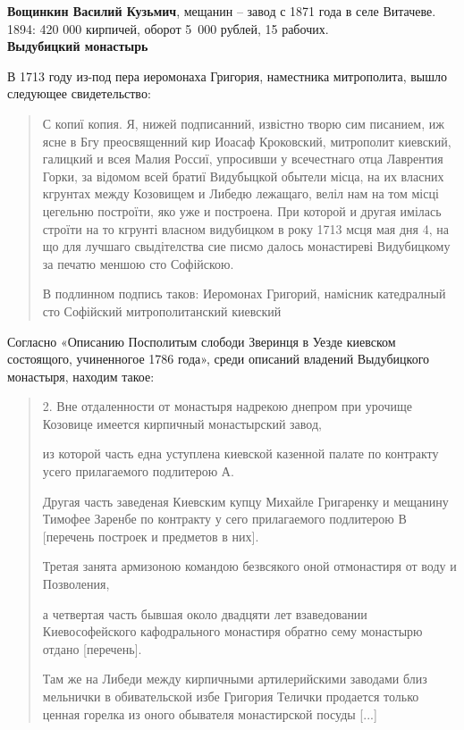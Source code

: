 \noindent\textbf{Вощинкин Василий Кузьмич}, мещанин – завод с 1871 года в селе Витачеве. 1894: 420 000 кирпичей, оборот \mbox{5 000} рублей, 15 рабочих.\\

\noindent\textbf{Выдубицкий монастырь}

В 1713 году из-под пера иеромонаха Григория, наместника митрополита, вышло следующее свидетельство:

\begin{quotation}
С копиї копия. Я, нижей подписанний, извістно творю сим писанием, иж ясне в Бгу преосвященний кир Иоасаф Кроковский, митрополит киевский, галицкий и всея Малия Россиї, упросивши у всечестнаго отца Лаврентия Горки, за відомом всей братиї Видубыцкой обытели місца, на их власних кгрунтах между Козовищем и Либедю лежащаго, веліл нам на том місці цегельню построїти, яко уже и построена. При которой и другая имілась строїти на то кгрунті власном видубицком в року 1713 мсця мая дня 4, на що для лучшаго свыдітелства сие писмо далось монастиреві Видубицкому за печатю меншою сто Софійскою.

В подлинном подпись таков:
Иеромонах Григорий, намісник катедралный сто Софійский митрополитанский киевский
\end{quotation}


Согласно «Описанию Посполитым слободи Зверинця в Уезде киевском состоящого, учиненногое 1786 года», среди описаний владений Выдубицкого монастыря, находим такое:

\begin{quotation}
2. Вне отдаленности от монастыря надрекою днепром при урочище Козовице имеется кирпичный монастырский завод, 

из которой часть една уступлена киевской казенной палате по контракту усего прилагаемого подлитерою А. 

Другая часть заведеная Киевским купцу Михайле Григаренку и мещанину Тимофее Заренбе по контракту у сего прилагаемого подлитерою В [перечень построек и предметов в них].

Третая занята армизоною командою безвсякого оной отмонастиря от воду и Позволения,

а четвертая часть бывшая около двадцяти лет взаведовании Киевософейского кафодрального монастиря обратно сему монастырю отдано [перечень].

Там же на Либеди между кирпичными артилерийскими заводами близ мельнички в обивательской избе Григория Телички продается только ценная горелка из оного обывателя монастирской посуды [...]
\end{quotation}

